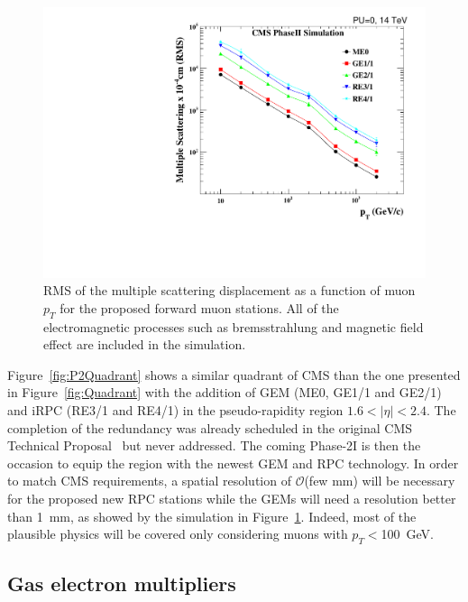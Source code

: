 	\begin{figure}
		\centering
		\includegraphics[width=\linewidth]{fig/chapt3/MS_allstations.pdf}
		\caption{\label{fig:MultiScat} RMS of the multiple scattering displacement as a function of muon $p_T$ for the proposed forward muon stations. All of the electromagnetic processes such as bremsstrahlung and magnetic field effect are included in the simulation.}
	\end{figure}
	
	Figure~\ref{fig:P2Quadrant} shows a similar quadrant of CMS than the one presented in Figure~\ref{fig:Quadrant} with the addition of \acf{GEM} (ME0, GE1/1 and GE2/1) and \acf{iRPC} (RE3/1 and RE4/1) in the pseudo-rapidity region $1.6<\vert\eta\vert<2.4$. The completion of the redundancy was already scheduled in the original CMS Technical Proposal~\cite{CMSTP} but never addressed. The coming Phase-2I is then the occasion to equip the region with the newest GEM and RPC technology. In order to match CMS requirements, a spatial resolution of $\mathcal{O}$(few $\mathrm{mm}$) will be necessary for the proposed new RPC stations while the GEMs will need a resolution better than \SI{1}{mm}, as showed by the simulation in Figure~\ref{fig:MultiScat}. Indeed, most of the plausible physics will be covered only considering muons with $p_T\!\!<$\SI{100}{GeV}.
	
\endgroup
	
	\subsection{Gas electron multipliers}
	\label{chapt3:ssec:GEMs}

